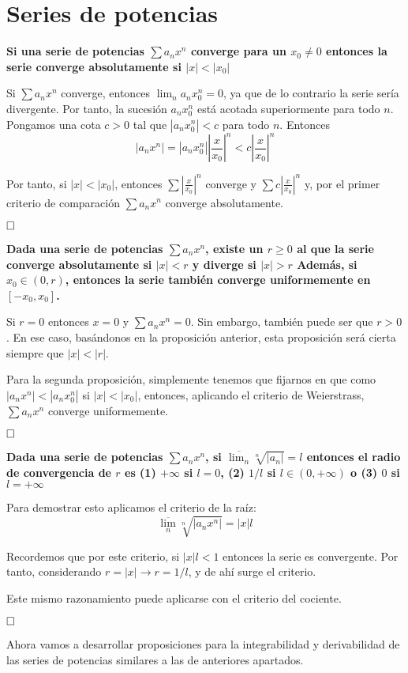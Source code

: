 \documentclass[a4paper]{article}
\newcommand{\qed}{\begin{flushright}
		{$\newline\square$}
	\end{flushright}}
\begin{document}
\section{Series de potencias}

\textbf{Si una serie de potencias $\sum a_n x^n$ converge para un $x_0\neq0$ entonces la serie converge absolutamente si $|x| < |x_0|$}

Si $\sum a_n x^n$ converge, entonces $\lim_n a_nx^n_0 = 0$, ya que de lo contrario la serie sería divergente. Por tanto, la sucesión $a_nx^n_0$ está acotada superiormente para todo $n$. Pongamos una cota $c>0$ tal que $|a_nx_0^n| < c$ para todo $n$. Entonces
$$|a_nx^n| = |a_nx_0^n|\left|\frac{x}{x_0}\right|^n < c \left|\frac{x}{x_0}\right|^n$$

Por tanto, si $|x|<|x_0|$, entonces $\sum \left|\frac{x}{x_0}\right|^n$ converge y $\sum c\left|\frac{x}{x_0}\right|^n$ y, por el primer criterio de comparación $\sum a_n x^n$ converge absolutamente.\qed

\textbf{Dada una serie de potencias $\sum a_nx^n$, existe un $r\ge0$ al que la serie converge absolutamente si $|x|<r$ y diverge si $|x|>r$ Además, si $x_0 \in (0,r)$, entonces la serie también converge uniformemente en $[-x_0,x_0]$.}

Si $r = 0$ entonces $x = 0$ y $\sum a_n x^n = 0$. Sin embargo, también puede ser que $r>0$. En ese caso, basándonos en la proposición anterior, esta proposición será cierta siempre que $|x| < |r|$.

Para la segunda proposición, simplemente tenemos que fijarnos en que como $|a_nx^n| < |a_nx_0^n|$ si $|x|<|x_0|$, entonces, aplicando el criterio de Weierstrass, $\sum a_nx^n$ converge uniformemente. 
\qed


\textbf{Dada una serie de potencias $\sum a_nx^n$, si $\overline{\lim_n} \sqrt[n]{|a_n|} = l$ entonces el radio de convergencia de $r$ es (1) $+\infty$ si $l=0$, (2) $1/l$ si $l\in(0, +\infty)$ o (3) $0$ si $l = +\infty$}

Para demostrar esto aplicamos el criterio de la raíz: 
$$\overline{\lim_n} \sqrt[n]{|a_nx^n|} = |x|l$$

Recordemos que por este criterio, si $|x|l < 1$ entonces la serie es convergente. Por tanto, considerando $r = |x| \rightarrow r = 1/l$, y de ahí surge el criterio.

Este mismo razonamiento puede aplicarse con el criterio del cociente.\qed



Ahora vamos a desarrollar proposiciones para la integrabilidad y derivabilidad de las series de potencias similares a las de anteriores apartados.
\end{document}
